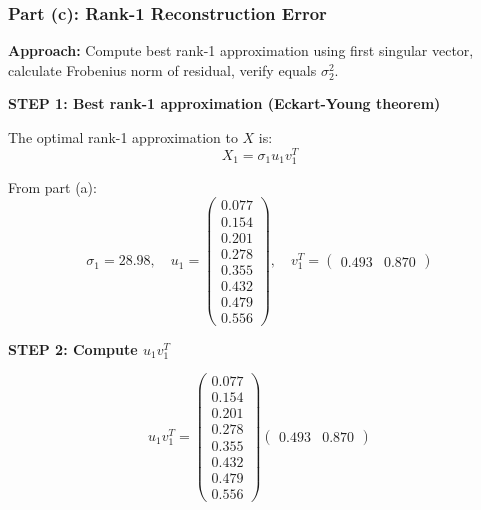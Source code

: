 \documentclass[12pt]{article}
\begin{document}
\subsubsection{Part (c): Rank-1 Reconstruction Error}

\begin{solution}

\textbf{Approach:} Compute best rank-1 approximation using first singular vector, calculate Frobenius norm of residual, verify equals $\sigma_2^2$.

\textbf{STEP 1: Best rank-1 approximation (Eckart-Young theorem)}

The optimal rank-1 approximation to $X$ is:
\[
X_1 = \sigma_1 u_1 v_1^T
\]

From part (a):
\[
\sigma_1 = 28.98, \quad u_1 = \begin{pmatrix}
0.077 \\
0.154 \\
0.201 \\
0.278 \\
0.355 \\
0.432 \\
0.479 \\
0.556
\end{pmatrix}, \quad v_1^T = \begin{pmatrix}
0.493 & 0.870
\end{pmatrix}
\]

\textbf{STEP 2: Compute $u_1 v_1^T$}

\[
u_1 v_1^T = \begin{pmatrix}
0.077 \\
0.154 \\
0.201 \\
0.278 \\
0.355 \\
0.432 \\
0.479 \\
0.556
\end{pmatrix}
\begin{pmatrix}
0.493 & 0.870
\end{pmatrix}
\]


\end{solution}
\end{document}
